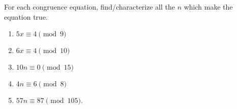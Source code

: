 For each congruence equation, find/characterize all the $n$ which make the equation true.

\begin{enumerate}
    \item $5x \equiv 4 \pmod{9}$
    \item $6x \equiv 4 \pmod{10}$
    \item $10n \equiv 0 \pmod{15}$
    \item $4n \equiv 6 \pmod{8}$
    \item $57n \equiv 87 \pmod{105}$.
\end{enumerate}